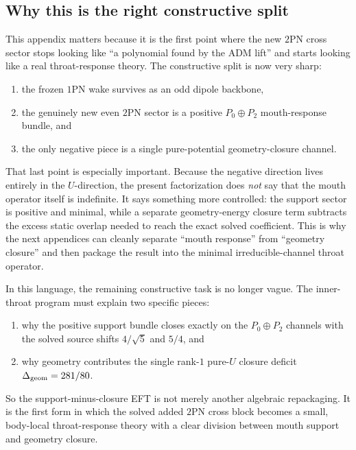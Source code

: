 \documentclass[11pt]{article}
\newcommand{\OnePN}{\mathrm{1PN}}
\newcommand{\TwoPN}{\mathrm{2PN}}
\newcommand{\ADM}{\mathrm{ADM}}
\begin{document}
\subsection{Why this is the right constructive split}
\label{app:mouth-port-interpretation}

This appendix matters because it is the first point where the new \(\TwoPN\) cross
sector stops looking like ``a polynomial found by the \(\ADM\) lift'' and starts
looking like a real throat-response theory.
The constructive split is now very sharp:
\begin{enumerate}[leftmargin=1.5em]
  \item the frozen \(\OnePN\) wake survives as an odd dipole backbone,
  \item the genuinely new even \(\TwoPN\) sector is a positive
  \(P_0\oplus P_2\) mouth-response bundle, and
  \item the only negative piece is a single pure-potential geometry-closure channel.
\end{enumerate}
That last point is especially important.  Because the negative direction lives entirely
in the \(U\)-direction, the present factorization does \emph{not} say that the mouth
operator itself is indefinite.  It says something more controlled: the support sector is
positive and minimal, while a separate geometry-energy closure term subtracts the excess
static overlap needed to reach the exact solved coefficient.  This is why the next
appendices can cleanly separate ``mouth response'' from ``geometry closure'' and then
package the result into the minimal irreducible-channel throat operator.

In this language, the remaining constructive task is no longer vague.  The inner-throat
program must explain two specific pieces:
\begin{enumerate}[leftmargin=1.5em]
  \item why the positive support bundle closes exactly on the
  \(P_0\oplus P_2\) channels with the solved source shifts
  \(4/\sqrt5\) and \(5/4\), and
  \item why geometry contributes the single rank-\(1\) pure-\(U\) closure deficit
  \(\Delta_{\rm geom}=281/80\).
\end{enumerate}
So the support-minus-closure EFT is not merely another algebraic repackaging.  It is the
first form in which the solved added \(\TwoPN\) cross block becomes a small,
body-local throat-response theory with a clear division between mouth support and
geometry closure.
\end{document}
